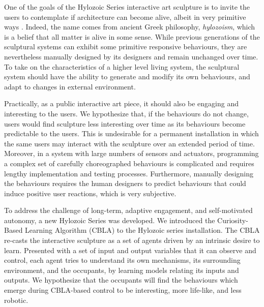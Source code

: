 One of the goals of the Hylozoic Series interactive art sculpture is to invite the users to contemplate if architecture can become alive, albeit in very primitive ways \cite{Beesley2012}. Indeed, the name comes from ancient Greek philosophy, \textit{hylozoism}, which is a belief that all matter is alive in some sense. While previous generations of the  sculptural systems can exhibit some primitive responsive behaviours, they are nevertheless manually designed by its designers and remain unchanged over time. To take on the characteristics of a higher level living system, the sculptural system should have the ability to generate and modify its own behaviours, and adapt to changes in external environment.

Practically, as a public interactive art piece, it should also be engaging and interesting to the users. We hypothesize that, if the behaviours do not change, users would find sculpture less interesting over time as its behaviours become predictable to the users. This is undesirable for a permanent installation in which the same users may interact with the sculpture over an extended period of time. 
Moreover, in a system with large numbers of sensors and actuators, programming a complex set of carefully choreographed behaviours is complicated and requires lengthy implementation and testing processes. Furthermore, manually designing the behaviours requires the human designers to predict behaviours that could induce positive user reactions, which is very subjective. 

To address the challenge of long-term, adaptive engagement, and self-motivated autonomy, a new Hylozoic Series was developed. We introduced the Curiosity-Based Learning Algorithm (CBLA) to the Hylozoic series installation. The CBLA re-casts the interactive sculpture as a set of agents driven by an intrinsic desire to learn. Presented with a set of input and output variables that it can observe and control, each agent tries to understand its own mechanisms, its surrounding environment, and the occupants, by learning models relating its inputs and outputs. We hypothesize that the occupants will find the behaviours which emerge during CBLA-based control to be interesting, more life-like, and less robotic. 

